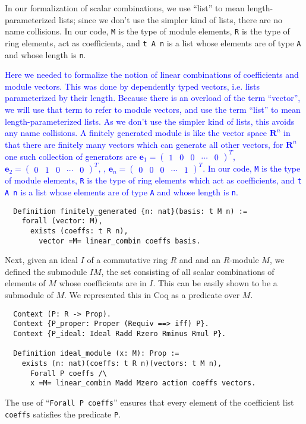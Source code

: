 \documentclass{article}
\begin{document}
In our formalization of scalar combinations, 
we use  ``list'' to mean length-parameterized lists; since we don't use the simpler
kind of lists, there are no name collisions.
In our code, \texttt{M} is the type of module elements, \texttt{R} is the type of ring
elements,  act as coefficients, and \texttt{t A n} is a list whose elements
are of type \texttt{A} and whose length is \texttt{n}.


\textcolor{blue}{Here we needed to formalize the notion of linear combinations of
coefficients and module vectors. This was done by dependently typed vectors,
i.e. lists parameterized by their length. Because there is an overload of the
term ``vector'', we will use that term to refer to module vectors, and use the
term ``list'' to mean length-parameterized lists. As we don't use the simpler
kind of lists, this avoids any name collisions. A finitely generated module is
like the vector space \(\mathbf{R}^{n}\) in that there are finitely many
vectors which can generate all other vectors, for \(\mathbf{R}^{n}\) one such
collection of generators are \(\mathbf{e}_{1} = \begin{pmatrix} 1 & 0 & 0 &
  \cdots & 0\end{pmatrix}^{T}\), \(\mathbf{e}_{2} = \begin{pmatrix} 0 & 1 & 0 &
  \cdots & 0\end{pmatrix}^{T}\), \textellipsis, \(\mathbf{e}_{n} =
  \begin{pmatrix} 0 & 0 & 0 & \cdots & 1\end{pmatrix}^{T}\). In our code,
\texttt{M} is the type of module elements, \texttt{R} is the type of ring
elements which act as coefficients, and \texttt{t A n} is a list whose elements
are of type \texttt{A} and whose length is \texttt{n}.
}

\begin{verbatim}
  Definition finitely_generated {n: nat}(basis: t M n) :=
    forall (vector: M),
      exists (coeffs: t R n),
        vector =M= linear_combin coeffs basis.
\end{verbatim}



Next, given an ideal \(I\) of a commutative ring $R$ and and an $R$-module \(M\), 
we defined the submodule $IM$, the set consisting of all scalar combinations of elements of \(M\) whose coefficients are in  \(I\). This can be easily shown to be a submodule of
\(M\). We represented this in Coq as a predicate over \(M\).
\begin{verbatim}
  Context (P: R -> Prop).
  Context {P_proper: Proper (Requiv ==> iff) P}.
  Context {P_ideal: Ideal Radd Rzero Rminus Rmul P}.
  
  Definition ideal_module (x: M): Prop :=
    exists (n: nat)(coeffs: t R n)(vectors: t M n),
      Forall P coeffs /\
      x =M= linear_combin Madd Mzero action coeffs vectors.
\end{verbatim}
The use of  ``\verb|Forall P coeffs|'' ensures that every element of the coefficient list
\texttt{coeffs} satisfies the predicate \texttt{P}.  
\end{document}
